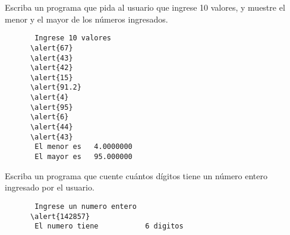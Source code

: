 \documentclass[10pt]{beamer}
\begin{document}
  \begin{frame}
    
  \end{frame}

  \begin{frame}
    
  \end{frame}

  \begin{frame}[fragile]
    Escriba un programa que pida al usuario que ingrese 10 valores,
    y muestre el menor y el mayor de los números ingresados.

    \begin{Verbatim}
       Ingrese 10 valores
      \alert{67}
      \alert{43}
      \alert{42}
      \alert{15}
      \alert{91.2}
      \alert{4}
      \alert{95}
      \alert{6}
      \alert{44}
      \alert{43}
       El menor es   4.0000000
       El mayor es   95.000000
    \end{Verbatim}

\end{frame}

  \begin{frame}
    
  \end{frame}

  \begin{frame}
    
  \end{frame}

  \begin{frame}[fragile]
    Escriba un programa que cuente
    cuántos dígitos tiene un número entero
    ingresado por el usuario.

    \begin{Verbatim}
       Ingrese un numero entero
      \alert{142857}
       El numero tiene           6 digitos
    \end{Verbatim}

\end{frame}

  \begin{frame}
    
  \end{frame}
\end{document}
